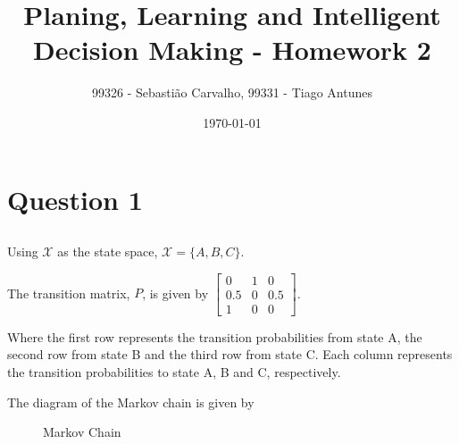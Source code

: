 \documentclass{article}
\title{Planing, Learning and Intelligent Decision Making - Homework 2}
\author{99326 - Sebastião Carvalho, 99331 - Tiago Antunes}
\date{\today}
\begin{document}
\maketitle

\tableofcontents

\section{Question 1}

\subsection{}

Using $\mathcal{X}$ as the state space, $\mathcal{X} = \{ A, B, C\}$.

\bigskip

The transition matrix, $P$, is given by
$
\begin{bmatrix}
    0 & 1 & 0 \\
    0.5 & 0 & 0.5 \\
    1 & 0 & 0
\end{bmatrix}
$.

\bigskip

Where the first row represents the transition probabilities from state A, the second row from state B and the third row from state C.
Each column represents the transition probabilities to state A, B and C, respectively.

\bigskip

The diagram of the Markov chain is given by

\begin{figure}
    \centering
    \caption{Markov Chain}
    \label{fig: markov_chain}
\end{figure}


\subsection{}
\end{document}

